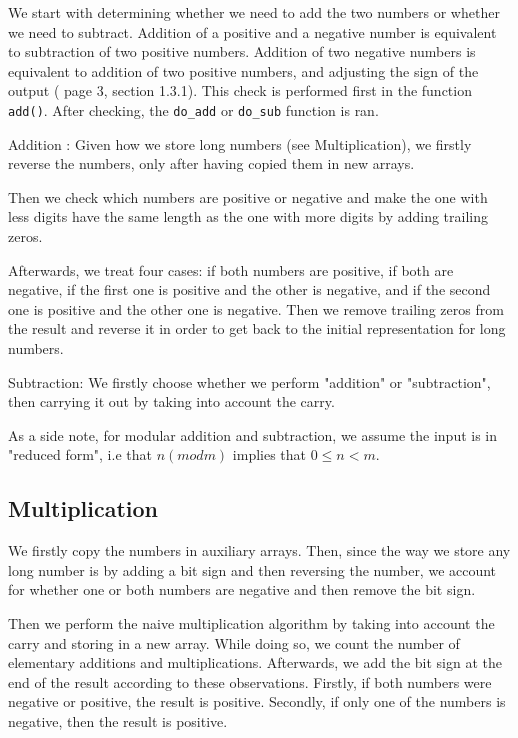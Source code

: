 \documentclass[a4paper]{article}
\begin{document}
We start with determining whether we need to add the two numbers or whether we need to subtract.
Addition of a positive and a negative number is equivalent to subtraction of two positive numbers.
Addition of two negative numbers is equivalent to addition of two positive numbers, and adjusting the sign of the output
(\cite{ant} page 3, section 1.3.1).
This check is performed first in the function \texttt{add()}.
After checking, the \texttt{do\_add} or \texttt{do\_sub} function is ran.

Addition : Given how we store long numbers (see Multiplication), we firstly reverse the numbers, only after having copied them in new arrays. 

Then we check which numbers are positive or negative and make the  one with less digits have the same length as the one with more digits by adding trailing zeros. 

Afterwards, we treat four cases: if both numbers are positive, if both are negative, if the first one is positive and the other is negative, and if the second one is positive and the other one is negative. Then we remove trailing zeros from the result and reverse it in order to get back to the initial representation for long numbers.

Subtraction: We firstly choose whether we perform "addition"  or "subtraction", then carrying it out by taking into account the carry. 

As a side note, for modular addition and subtraction, we assume the input is in "reduced form", i.e that $n (mod m)$ implies that $0 \leq n < m.$


\subsection{Multiplication}

We firstly copy the numbers in auxiliary arrays. Then, since the way we store any long number is by adding a bit sign and then reversing the number, we account for whether one or both numbers are negative and then remove the bit sign. 

Then we perform the naive multiplication algorithm \cite{shoup} by taking into account the carry and storing in a new array. While doing so, we count the number of elementary additions and multiplications. Afterwards, we add the bit sign at the end of the result according to these observations. Firstly, if both numbers were negative or positive, the result is positive. Secondly, if only one of the numbers is negative, then the result is positive. 
\end{document}
